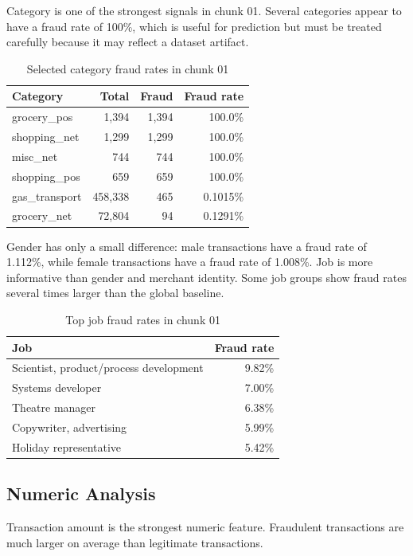 \documentclass[12pt,a4paper,twoside]{article}
\begin{document}
Category is one of the strongest signals in chunk 01. Several categories appear to have a fraud rate of 100\%, which is useful for prediction but must be treated carefully because it may reflect a dataset artifact.

\begin{table}[H]
\centering
\caption{Selected category fraud rates in chunk 01}
\begin{tabular}{lrrr}
\toprule
\textbf{Category} & \textbf{Total} & \textbf{Fraud} & \textbf{Fraud rate} \\
\midrule
grocery\_pos & 1,394 & 1,394 & 100.0\% \\
shopping\_net & 1,299 & 1,299 & 100.0\% \\
misc\_net & 744 & 744 & 100.0\% \\
shopping\_pos & 659 & 659 & 100.0\% \\
gas\_transport & 458,338 & 465 & 0.1015\% \\
grocery\_net & 72,804 & 94 & 0.1291\% \\
\bottomrule
\end{tabular}
\end{table}

Gender has only a small difference: male transactions have a fraud rate of 1.112\%, while female transactions have a fraud rate of 1.008\%. Job is more informative than gender and merchant identity. Some job groups show fraud rates several times larger than the global baseline.

\begin{table}[H]
\centering
\caption{Top job fraud rates in chunk 01}
\begin{tabular}{lr}
\toprule
\textbf{Job} & \textbf{Fraud rate} \\
\midrule
Scientist, product/process development & 9.82\% \\
Systems developer & 7.00\% \\
Theatre manager & 6.38\% \\
Copywriter, advertising & 5.99\% \\
Holiday representative & 5.42\% \\
\bottomrule
\end{tabular}
\end{table}

\subsection{Numeric Analysis}

Transaction amount is the strongest numeric feature. Fraudulent transactions are much larger on average than legitimate transactions.
\end{document}
